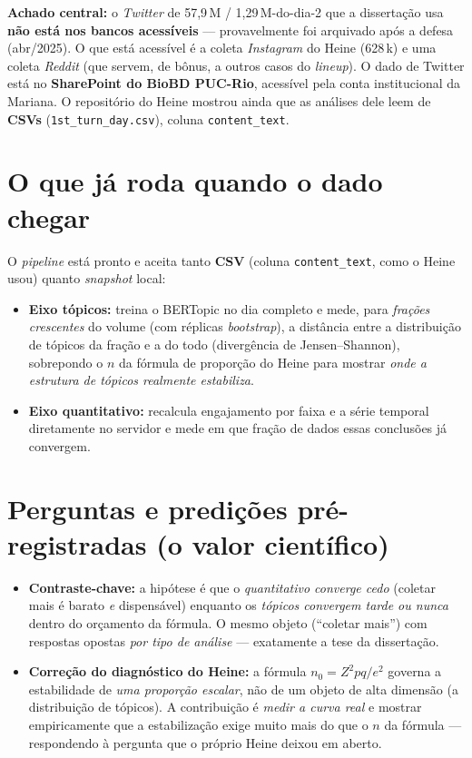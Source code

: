 \documentclass[11pt,a4paper]{article}
\begin{document}
\textbf{Achado central:} o \emph{Twitter} de 57,9\,M / 1,29\,M-do-dia-2 que a dissertação
usa \textbf{não está nos bancos acessíveis} — provavelmente foi arquivado após a defesa
(abr/2025). O que está acessível é a coleta \emph{Instagram} do Heine (628\,k) e uma coleta
\emph{Reddit} (que servem, de bônus, a outros casos do \emph{lineup}). O dado de Twitter
está no \textbf{SharePoint do BioBD PUC-Rio}, acessível pela conta institucional da Mariana.
O repositório do Heine mostrou ainda que as análises dele leem de \textbf{CSVs}
(\texttt{1st\_turn\_day.csv}), coluna \texttt{content\_text}.

\section{O que já roda quando o dado chegar}

O \emph{pipeline} está pronto e aceita tanto \textbf{CSV} (coluna \texttt{content\_text},
como o Heine usou) quanto \emph{snapshot} local:

\begin{itemize}
\item \textbf{Eixo tópicos:} treina o BERTopic no dia completo e mede, para \emph{frações
crescentes} do volume (com réplicas \emph{bootstrap}), a distância entre a distribuição de
tópicos da fração e a do todo (divergência de Jensen--Shannon), sobrepondo o $n$ da fórmula
de proporção do Heine para mostrar \emph{onde a estrutura de tópicos realmente estabiliza}.
\item \textbf{Eixo quantitativo:} recalcula engajamento por faixa e a série temporal
diretamente no servidor e mede em que fração de dados essas conclusões já convergem.
\end{itemize}

\section{Perguntas e predições pré-registradas (o valor científico)}

\begin{itemize}
\item \textbf{Contraste-chave:} a hipótese é que o \emph{quantitativo converge cedo}
(coletar mais é barato \emph{e} dispensável) enquanto os \emph{tópicos convergem tarde ou
nunca} dentro do orçamento da fórmula. O mesmo objeto (``coletar mais'') com respostas
opostas \emph{por tipo de análise} — exatamente a tese da dissertação.
\item \textbf{Correção do diagnóstico do Heine:} a fórmula $n_0 = Z^2pq/e^2$ governa a
estabilidade de \emph{uma proporção escalar}, não de um objeto de alta dimensão (a
distribuição de tópicos). A contribuição é \emph{medir a curva real} e mostrar
empiricamente que a estabilização exige muito mais do que o $n$ da fórmula — respondendo à
pergunta que o próprio Heine deixou em aberto.
\end{itemize}
\end{document}
